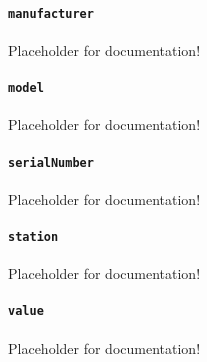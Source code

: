 \paragraph{\texttt{manufacturer}}\mbox{}
\newline\tab Placeholder for documentation!

\paragraph{\texttt{model}}\mbox{}
\newline\tab Placeholder for documentation!

\paragraph{\texttt{serialNumber}}\mbox{}
\newline\tab Placeholder for documentation!

\paragraph{\texttt{station}}\mbox{}
\newline\tab Placeholder for documentation!

\paragraph{\texttt{value}}\mbox{}
\newline\tab Placeholder for documentation!
\FloatBarrier
